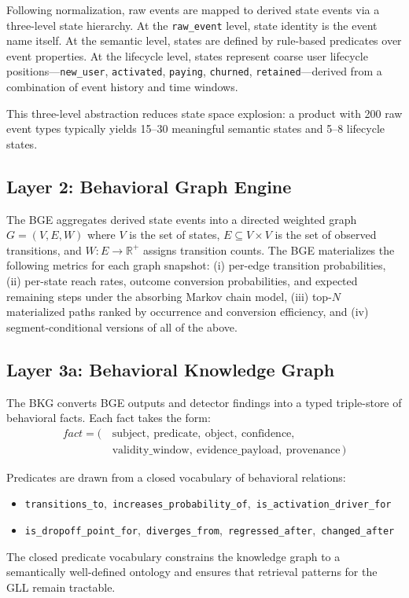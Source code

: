 \documentclass[12pt, a4paper]{article}
\begin{document}
Following normalization, raw events are mapped to derived state events via a three-level state hierarchy. At the \texttt{raw\_event} level, state identity is the event name itself. At the semantic level, states are defined by rule-based predicates over event properties. At the lifecycle level, states represent coarse user lifecycle positions---\texttt{new\_user}, \texttt{activated}, \texttt{paying}, \texttt{churned}, \texttt{retained}---derived from a combination of event history and time windows.

This three-level abstraction reduces state space explosion: a product with 200 raw event types typically yields 15--30 meaningful semantic states and 5--8 lifecycle states.

\subsection{Layer 2: Behavioral Graph Engine}

The BGE aggregates derived state events into a directed weighted graph $G = (V, E, W)$ where $V$ is the set of states, $E \subseteq V \times V$ is the set of observed transitions, and $W: E \to \mathbb{R}^+$ assigns transition counts. The BGE materializes the following metrics for each graph snapshot: (i) per-edge transition probabilities, (ii) per-state reach rates, outcome conversion probabilities, and expected remaining steps under the absorbing Markov chain model, (iii) top-$N$ materialized paths ranked by occurrence and conversion efficiency, and (iv) segment-conditional versions of all of the above.

\subsection{Layer 3a: Behavioral Knowledge Graph}

The BKG converts BGE outputs and detector findings into a typed triple-store of behavioral facts. Each fact takes the form:
\begin{align*}
\textit{fact} = (\, &\text{subject},\ \text{predicate},\ \text{object},\ \text{confidence}, \\
                    &\text{validity\_window},\ \text{evidence\_payload},\ \text{provenance}\,)
\end{align*}

Predicates are drawn from a closed vocabulary of behavioral relations:
\begin{itemize}[noitemsep, leftmargin=2em]
  \item \texttt{transitions\_to},\ \texttt{increases\_probability\_of},\ \texttt{is\_activation\_driver\_for}
  \item \texttt{is\_dropoff\_point\_for},\ \texttt{diverges\_from},\ \texttt{regressed\_after},\ \texttt{changed\_after}
\end{itemize}
The closed predicate vocabulary constrains the knowledge graph to a semantically well-defined ontology and ensures that retrieval patterns for the GLL remain tractable.
\end{document}
